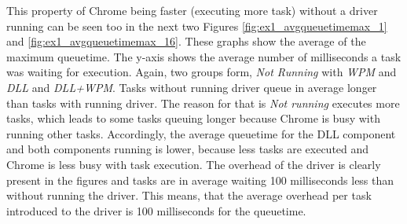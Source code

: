 This property of Chrome being faster (executing more task) without a driver running can be seen too in the next two Figures \ref{fig:ex1_avgqueuetimemax_1} and \ref{fig:ex1_avgqueuetimemax_16}. These graphs show the average of the maximum queuetime. The y-axis shows the average number of milliseconds a task was waiting for execution. Again, two groups form, \emph{Not Running} with \emph{\gls{WPM}} and \emph{\gls{DLL}} and \emph{\gls{DLL}+\gls{WPM}}. Tasks without running driver queue in average longer than tasks with running driver. The reason for that is \emph{Not running} executes more tasks, which leads to some tasks queuing longer because Chrome is busy with running other tasks. Accordingly, the average queuetime for the \gls{DLL} component and both components running is lower, because less tasks are executed and Chrome is less busy with task execution. The overhead of the driver is clearly present in the figures and tasks are in average waiting 100 milliseconds less than without running the driver. This means, that the average overhead per task introduced to the driver is 100 milliseconds for the queuetime.
